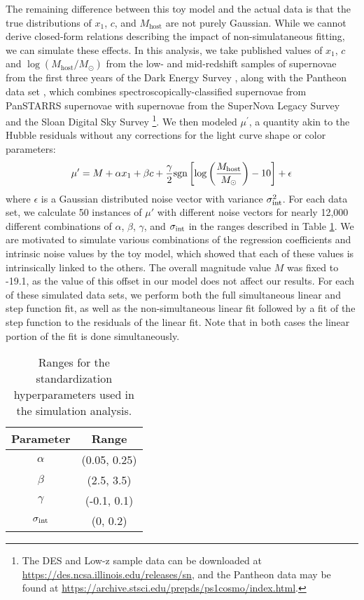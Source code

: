 The remaining difference between this toy model and the actual data is that the true distributions of $x_1$, $c$, and $M_\text{host}$ are not purely Gaussian. While we cannot derive closed-form relations describing the impact of non-simulataneous fitting, we can simulate these effects. In this analysis, we take published values of $x_1$, $c$ and $\log(M_\text{host}/M_\odot)$ from the low- and mid-redshift samples of supernovae from the first three years of the Dark Energy Survey \cite[][hereafter referred to as the Low-z and DES subsamples]{DES19}, along with the Pantheon data set \citep{Scolnic18}, which combines spectroscopically-classified supernovae from PanSTARRS supernovae \cite[PS1;][]{Rest14, Scolnic14} with supernovae from the SuperNova Legacy Survey \cite[SNLS;][]{Conley11, Sullivan11} and the Sloan Digital Sky Survey \cite[SDSS;][]{Frieman08, Kessler09, Sako14} \footnote{The DES and Low-z sample data can be downloaded at \url{https://des.ncsa.illinois.edu/releases/sn}, and the Pantheon data may be found at \url{https://archive.stsci.edu/prepds/ps1cosmo/index.html}.}. We then modeled $\mu^\prime$, a quantity akin to the Hubble residuals without any corrections for the light curve shape or color parameters:
\begin{equation}
    \mu^\prime= M + \alpha x_1 + \beta c + \frac{\gamma}{2}\text{sgn}\left[\log\left(\frac{M_\text{host}}{M_\odot}\right) - 10 \right] + \epsilon
\end{equation}
where $\epsilon$ is a Gaussian distributed noise vector with variance $\sigma_{\text{int}}^2$. For each data set, we calculate 50 instances of $\mu'$ with different noise vectors for nearly 12,000 different combinations of $\alpha$, $\beta$, $\gamma$, and $\sigma_{\text{int}}$ in the ranges described in Table \ref{tab:sim_ranges}. We are motivated to simulate various combinations of the regression coefficients and intrinsic noise values by the toy model, which showed that each of these values is intrinsically linked to the others. The overall magnitude value $M$ was fixed to -19.1, as the value of this offset in our model does not affect our results. For each of these simulated data sets, we perform both the full simultaneous linear and step function fit, as well as the non-simultaneous linear fit followed by a fit of the step function to the residuals of the linear fit. Note that in both cases the linear portion of the fit is done simultaneously.

\begin{table}[]
    \centering
    \begin{tabular}{|c|c|}
    \hline
        Parameter & Range \\\hline
        $\alpha$ & (0.05, 0.25) \\
        $\beta$ & (2.5, 3.5) \\
        $\gamma$ & (-0.1, 0.1) \\
        $\sigma_{\text{int}}$ & (0, 0.2) \\\hline
    \end{tabular}
    \caption{Ranges for the standardization hyperparameters used in the simulation analysis.}
    \label{tab:sim_ranges}
\end{table}

